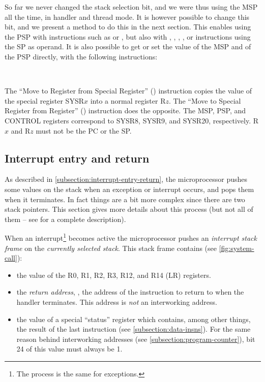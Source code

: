 So far we never changed the stack selection bit, and we were thus using the MSP
all the time, in handler and thread mode. It is however possible to change this
bit, and we present a method to do this in the next section. This enables using
the PSP with instructions such as  or , but also with
, , , , or  instructions using the
SP as operand. It is also possible to get or set the value of the MSP and of
the PSP directly, with the following instructions:

\begin{Paragraph}
  \medskip\\
\end{Paragraph}

The ``Move to Register from Special Register'' () instruction copies
the value of the special register SYSR$x$ into a normal register R$z$. The
``Move to Special Register from Register'' () instruction does the
opposite. The MSP, PSP, and CONTROL registers correspond to SYSR8, SYSR9, and
SYSR20, respectively. R$x$ and R$z$ must not be the PC or the SP.

\subsection{Interrupt entry and return}\label{subsection:interrupt-entry-exit2}

As described in \cref{subsection:interrupt-entry-return}, the microprocessor
pushes some values on the stack when an exception or interrupt occurs, and pops
them when it terminates. In fact things are a bit more complex since there are
two stack pointers. This section gives more details about this process (but not
all of them -- see \cite{ARMv7} for a complete description).

When an interrupt\footnote{The process is the same for exceptions.} becomes
active the microprocessor pushes an {\em interrupt stack frame} on the {\em
  currently selected stack}. This stack frame contains (see
\cref{fig:system-call}):
\begin{itemize}
  \item the value of the R0, R1, R2, R3, R12, and R14 (LR) registers.

  \item the {\em return address}, \ie, the address of the instruction to return
  to when the handler terminates. This address is {\em not} an interworking
  address.

  \item the value of a special ``status'' register which contains, among other
  things, the result of the last  instruction (see
  \cref{subsection:data-insns}). For the same reason behind interworking
  addresses (see \cref{subsection:program-counter}), bit 24 of this value must
  always be 1.
\end{itemize}


